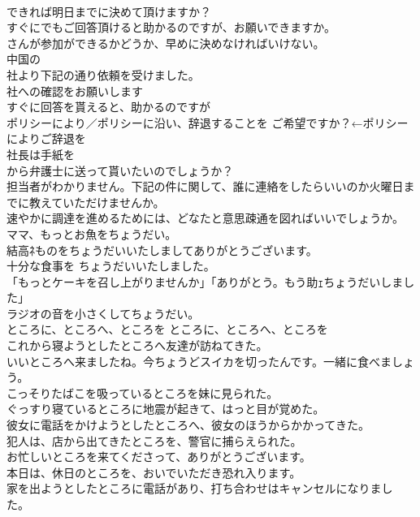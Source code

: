\documentclass[8pt]{extreport}
\begin{document}
\begin{CJK}{UTF8}{min}
\\	できれば明日までに決めて頂けますか？  
\\	すぐにでもご回答頂けると助かるのですが、お願いできますか。  
\\	さんが参加ができるかどうか、早めに決めなければいけない。  
\\	中国の
\\	社より下記の通り依頼を受けました。  
\\	社への確認をお願いします  
\\	すぐに回答を貰えると、助かるのですが  
\\	ポリシーにより／ポリシーに沿い、辞退することを ご希望ですか？←ポリシーによりご辞退を  
\\	社長は手紙を
\\	から弁護士に送って貰いたいのでしょうか？  
\\	担当者がわかりません。下記の件に関して、誰に連絡をしたらいいのか火曜日までに教えていただけませんか。  
\\	速やかに調達を進めるためには、どなたと意思疎通を図ればいいでしょうか。  
\\	ママ、もっとお魚をちょうだい。   
\\	結高ﾈものをちょうだいいたしましてありがとうございます。   
\\	十分な食事を ちょうだいいたしました。  
\\	「もっとケーキを召し上がりませんか」「ありがとう。もう助ｪちょうだいしました」   
\\	ラジオの音を小さくしてちょうだい。   
\\	ところに、ところへ、ところを	ところに、ところへ、ところを	
\\	これから寝ようとしたところへ友達が訪ねてきた。  
\\	いいところへ来ましたね。今ちょうどスイカを切ったんです。一緒に食べましょう。  
\\	こっそりたばこを吸っているところを妹に見られた。  
\\	ぐっすり寝ているところに地震が起きて、はっと目が覚めた。   
\\	彼女に電話をかけようとしたところへ、彼女のほうからかかってきた。   
\\	犯人は、店から出てきたところを、警官に捕らえられた。   
\\	お忙しいところを来てくださって、ありがとうございます。   
\\	本日は、休日のところを、おいでいただき恐れ入ります。  
\\	家を出ようとしたところに電話があり、打ち合わせはキャンセルになりました。  

\end{CJK}
\end{document}
